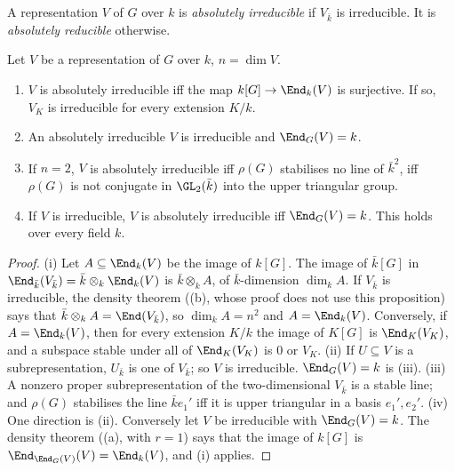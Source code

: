\begin{definition}\label{def:reps:absirr}
A representation $V$ of $G$ over $k$ is \emph{absolutely irreducible} if $V_{\bar k}$ is irreducible. It is \emph{absolutely reducible}
otherwise.
\end{definition}

\begin{proposition}\label{prop:reps:absirr}
Let $V$ be a representation of $G$ over $k$, $n=\dim V$.
\begin{enumerate}[label=(\roman*)]
\item $V$ is absolutely irreducible iff the map $k[G]\to\End_k(V)$ is surjective. If so, $V_K$ is irreducible for every extension $K/k$.
\item An absolutely irreducible $V$ is irreducible and $\End_G(V)=k$.
\item If $n=2$, $V$ is absolutely irreducible iff $\rho(G)$ stabilises no line of $\bar k^2$, iff $\rho(G)$ is not conjugate in $\GL_2(\bar k)$ into
the upper triangular group.
\item If $V$ is irreducible, $V$ is absolutely irreducible iff $\End_G(V)=k$. This holds over every field $k$.
\end{enumerate}
\end{proposition}

\begin{proof}
(i) Let $A\subseteq\End_k(V)$ be the image of $k[G]$. The image of $\bar k[G]$ in $\End_{\bar k}(V_{\bar k})=\bar k\otimes_k\End_k(V)$ is $\bar k\otimes_kA$, of
$\bar k$-dimension $\dim_kA$. If $V_{\bar k}$ is irreducible, the density theorem ((b), whose proof does not use this
proposition) says that $\bar k\otimes_kA=\End(V_{\bar k})$, so $\dim_kA=n^2$ and $A=\End_k(V)$. Conversely, if $A=\End_k(V)$, then for every
extension $K/k$ the image of $K[G]$ is $\End_K(V_K)$, and a subspace stable under all of $\End_K(V_K)$ is $0$ or $V_K$.
(ii) If $U\subseteq V$ is a subrepresentation, $U_{\bar k}$ is one of $V_{\bar k}$; so $V$ is irreducible. $\End_G(V)=k$ is (iii).
(iii) A nonzero proper subrepresentation of the two-dimensional $V_{\bar k}$ is a stable line; and $\rho(G)$ stabilises the line $\bar ke_1'$ iff it is
upper triangular in a basis $e_1',e_2'$.
(iv) One direction is (ii). Conversely let $V$ be irreducible with $\End_G(V)=k$. The density theorem ((a), with
$r=1$) says that the image of $k[G]$ is $\End_{\End_G(V)}(V)=\End_k(V)$, and (i) applies.
\end{proof}


